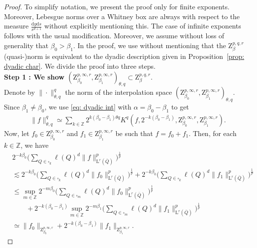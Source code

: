 \documentclass[11pt, leqno,parskip=half]{amsart}
\theoremstyle{definition}
\newcommand{\IZ}{\mathbb{Z}}
\renewcommand{\L}{\mathrm{L}}
\newcommand{\Z}{\mathrm{Z}}
\renewcommand{\d}{\mathrm{d}}
\numberwithin{equation}{section}
\begin{document}
\begin{proof}
    To simplify notation, we present the proof only for finite exponents. Moreover, Lebesgue norms over a Whitney box are always with respect to the measure $\frac{\d y \d s}{s^{d+1}}$ without explicitly mentioning this. The case of infinite exponents follows with the usual modification. Moreover, we assume without loss of generality that $\beta_0>\beta_1$. In the proof, we use without mentioning that the $\Z^{p,q,r}_\beta$ (quasi-)norm is equivalent to the dyadic description given in Proposition~\ref{prop: dyadic char}. We divide the proof into three steps. \\

    \noindent \textbf{Step 1 : We show $(\Z^{p,\infty,r}_{\beta_0} , \Z^{p,\infty,r}_{\beta_1} )_{\theta, q} \subset  \Z^{p, q,r}_{\beta}$}.\\
    Denote by $ \|\cdot\|^q_{\theta,q}$ the norm of the interpolation space $(\Z^{p,\infty,r}_{\beta_0} , \Z^{p,\infty,r}_{\beta_1} )_{\theta, q}$. Since $\beta_1\neq \beta_0$, we use \eqref{eq: dyadic int} with $\alpha = \beta_0-\beta_1$ to get
    \begin{align}
    \label{eq: real int char cont to dyad}
        \|f\|^q_{\theta,q}\simeq  \sum\limits_{k\in\IZ} 2^{k(\beta_0-\beta_1)\theta q} K^q(f,2^{-k(\beta_0-\beta_1)},\Z^{p,\infty,r}_{\beta_0} , \Z^{p,\infty,r}_{\beta_1}).
    \end{align}
    Now, let $f_0\in \Z^{p,\infty,r}_{\beta_0}$ and $f_1\in \Z^{p,\infty,r}_{\beta_1}$ be such that $f=f_0 + f_1$. Then, for each $k\in\IZ$, we have
    \begin{align*}
        &2^{- k\beta_0}\bigg(\sum\limits_{Q\in\square_k} \ell(Q)^d \|f\|_{\L^r(\bar Q)}^p\bigg)^\frac{1}{p}\\
        &\lesssim 2^{-k\beta_0}\bigg(\sum\limits_{Q\in\square_k} \ell(Q)^d \|f_0\|_{\L^r(\bar Q)}^p\bigg)^\frac{1}{p} + 2^{-k\beta_0}\bigg(\sum\limits_{Q\in\square_k} \ell(Q)^d \|f_1\|_{\L^r(\bar Q)}^p\bigg)^\frac{1}{p} \\
        &\leq \sup\limits_{m\in\IZ}2^{-m\beta_0}\bigg(\sum\limits_{Q\in\square_{m}} \ell(Q)^d \|f_0\|_{\L^r(\bar Q)}^p\bigg)^\frac{1}{p}\\
        &\qquad+ 2^{-k(\beta_0-\beta_1)} \sup\limits_{m\in\IZ}2^{-m\beta_1}\bigg(\sum\limits_{Q\in\square_{m}} \ell(Q)^d \|f_1\|_{\L^r(\bar Q)}^p\bigg)^\frac{1}{p} \\
        &\simeq \|f_0\|_{\Z^{p,\infty,r}_{\beta_0}} + 2^{-k(\beta_0-\beta_1)}\|f_1\|_{\Z^{p,\infty,r}_{\beta_1}}.
    \end{align*}

\end{proof}
\end{document}
